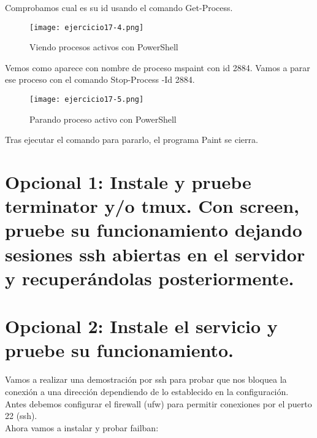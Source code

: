 	Comprobamos cual es su id usando el comando Get-Process.
	\begin{figure}[H]	
		\centering
		\texttt{[image: ejercicio17-4.png]} 
		\label{figura117} 
		\caption{Viendo procesos activos con PowerShell}
	\end{figure}
	Vemos como aparece con nombre de proceso mspaint con id 2884. Vamos a parar ese proceso con el comando Stop-Process -Id 2884.
	\begin{figure}[H]	
		\centering
		\texttt{[image: ejercicio17-5.png]} 
		\label{figura118} 
		\caption{Parando proceso activo con PowerShell}
	\end{figure}
	Tras ejecutar el comando para pararlo, el programa Paint se cierra.
	
	\section{Opcional 1: Instale y pruebe terminator y/o tmux. Con screen, pruebe su funcionamiento dejando sesiones ssh abiertas en el servidor y recuperándolas posteriormente.}
	
	
	\section{Opcional 2: Instale el servicio y pruebe su funcionamiento.}
	
	Vamos a realizar una demostración por ssh para probar que nos bloquea la conexión a una dirección dependiendo de lo establecido en la configuración.\\
	Antes debemos configurar el firewall (ufw) para permitir conexiones por el puerto 22 (ssh).\\
	
	Ahora vamos a instalar y probar failban\cite{opcional2-1,opcional2-2}:
	
